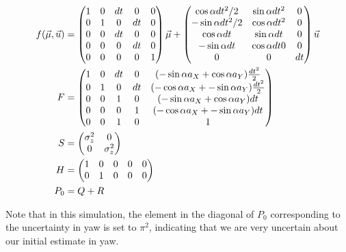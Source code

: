 \documentclass[10pt]{article}
\begin{document}
\begin{align}
  f(\vec{\mu}, \vec{u}) &= \begin{pmatrix}
    1 & 0 & dt & 0 & 0\\ 0 & 1 & 0 & dt &0 \\
    0&0&dt&0&0 \\ 0&0&0&dt&0 \\
    0&0&0&0&1  
  \end{pmatrix} \vec{\mu} 
  + \begin{pmatrix} 
    \cos{\alpha} dt^2/2 & \sin\alpha dt^2 & 0 \\
    -\sin\alpha dt^2/2 & \cos{\alpha} dt^2  & 0 \\
    \cos{\alpha} dt & \sin\alpha dt & 0 \\
    -\sin\alpha dt & \cos{\alpha} dt0 & 0 \\
     0 & 0 & dt \\               
  \end{pmatrix} \vec u
  \\
  F & = \begin{pmatrix}
    1 & 0 & dt & 0 & (-\sin\alpha a_X  + \cos{\alpha} a_Y) \frac{dt^2}{2} \\
    0 & 1 & 0 & dt & (-\cos{\alpha} a_X  + -\sin\alpha a_Y) \frac{dt^2}{2} \\
    0 & 0 & 1 & 0 & (-\sin\alpha a_X  + \cos{\alpha} a_Y) dt \\
    0 & 0 & 0 & 1 & (-\cos{\alpha} a_X  + -\sin\alpha a_Y) dt \\ 
    0 & 0 & 1 & 0 & 1 
  \end{pmatrix}\\
  S &= \begin{pmatrix}
    \sigma_z^2 & 0 \\ 0 & \sigma_z^2
  \end{pmatrix} \\ 
H &= \begin{pmatrix} 1 & 0 & 0 & 0 & 0 \\ 0 & 1 & 0 & 0 & 0 \end{pmatrix} \\
  P_0 &= Q + R
\end{align}

Note that in this simulation, the element in the diagonal of $P_0$ corresponding to the uncertainty in yaw is set to $\pi^2$, indicating that we are very uncertain about our initial estimate in yaw.
\end{document}
